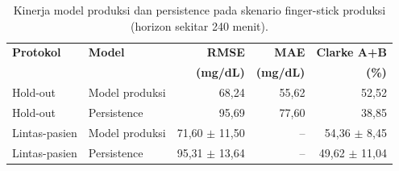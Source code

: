 \begin{table}[!htbp]
    \centering
    \caption{Kinerja model produksi dan persistence pada skenario finger-stick produksi (horizon sekitar 240 menit).}
    \label{tab:tab6.5_kinerja_fingerstick_produksi}
    \small
    \begin{tabular}{llrrr}
        \toprule
        \textbf{Protokol} & \textbf{Model} & \textbf{RMSE} & \textbf{MAE} & \textbf{Clarke A+B} \\
        & & \textbf{(mg/dL)} & \textbf{(mg/dL)} & \textbf{(\%)} \\
        \midrule
        Hold-out & Model produksi & 68,24 & 55,62 & 52,52 \\
        Hold-out & Persistence & 95,69 & 77,60 & 38,85 \\
        Lintas-pasien & Model produksi & 71,60 $\pm$ 11,50 & -- & 54,36 $\pm$ 8,45 \\
        Lintas-pasien & Persistence & 95,31 $\pm$ 13,64 & -- & 49,62 $\pm$ 11,04 \\
        \bottomrule
    \end{tabular}
\end{table}
